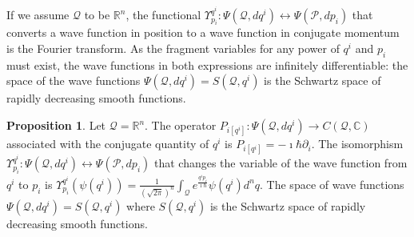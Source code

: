 \documentclass[smallextended]{svjour3}
\numberwithin{equation}{section}
\theoremstyle{definition}
\newtheorem{prop}[equation]{Proposition}
\begin{document}
If we assume $\mathcal{Q}$ to be $\mathbb{R}^n$, the functional $\Upsilon^{q^i}_{p_i} : \Psi(\mathcal{Q}, dq^i) \leftrightarrow \Psi(\mathcal{P}, dp_i)$ that converts a wave function in position to a wave function in conjugate momentum is the Fourier transform. As the fragment variables for any power of $q^i$ and $p_i$ must exist, the wave functions in both expressions are infinitely differentiable: the space of the wave functions $\Psi(\mathcal{Q}, dq^i) = S(\mathcal{Q}, q^i)$ is the Schwartz space of rapidly decreasing smooth functions.

\begin{prop}\label{prop:momentum_operator}
	Let $\mathcal{Q}=\mathbb{R}^n$. The operator $P_{i [q^i]} : \Psi(\mathcal{Q}, dq^i) \rightarrow C(\mathcal{Q}, \mathbb{C})$ associated with the conjugate quantity of $q^i$ is $P_{i [q^i]} = - \imath \hbar \partial_{i}$. The isomorphism $\Upsilon^{q^i}_{p_i} : \Psi(\mathcal{Q}, dq^i) \leftrightarrow \Psi(\mathcal{P}, dp_i)$ that changes the variable of the wave function from $q^i$ to $p_i$ is $\Upsilon^{q^i}_{p_i} (\psi(q^i)) = \frac{1}{(\sqrt{2\pi})^n} \int_{\mathcal{Q}} e^{\frac{q^i p_i }{\imath \hbar}} \psi(q^i) d^n q $. The space of wave functions $\Psi(\mathcal{Q}, dq^i) = S(\mathcal{Q}, q^i)$ where $S(\mathcal{Q}, q^i)$ is the Schwartz space of rapidly decreasing smooth functions. 
\end{prop}
\end{document}
